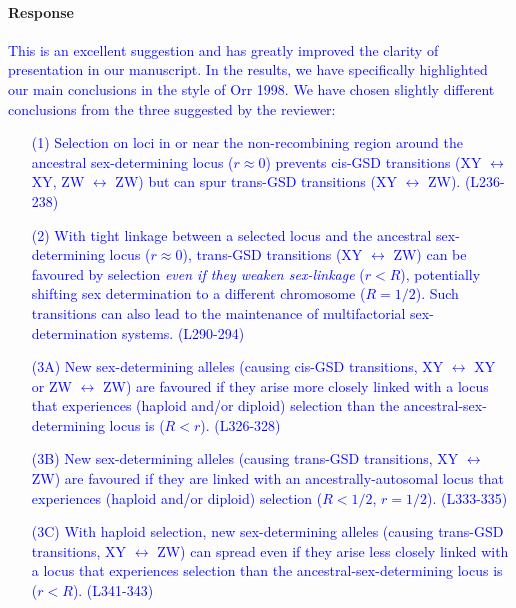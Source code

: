 \documentclass[10pt,letterpaper]{article}
\begin{document}
\noindent\paragraph{Response}
\textcolor{blue}{
This is an excellent suggestion and has greatly improved the clarity of presentation in our manuscript. In the results, we have specifically highlighted our main conclusions in the style of Orr 1998. We have chosen slightly different conclusions from the three suggested by the reviewer: 
\begin{enumerate}
\item[(1)] Selection on loci in or near the non-recombining region around the ancestral sex-determining locus ($r\approx0$) prevents cis-GSD transitions (XY $\leftrightarrow$ XY, ZW $\leftrightarrow$ ZW) but can spur trans-GSD transitions (XY $\leftrightarrow$ ZW). (L236-238)
\item[(2)] With tight linkage between a selected locus and the ancestral sex-determining locus ($r\approx0$), trans-GSD transitions (XY $\leftrightarrow$ ZW) can be favoured by selection \textit{even if they weaken sex-linkage} ($r<R$), potentially shifting sex determination to a different chromosome ($R=1/2$). 
Such transitions can also lead to the maintenance of multifactorial sex-determination systems. (L290-294)
\item[(3A)] New sex-determining alleles (causing cis-GSD transitions, XY $\leftrightarrow$ XY or ZW $\leftrightarrow$ ZW) are favoured if they arise more closely linked with a locus that experiences (haploid and/or diploid) selection than the ancestral-sex-determining locus is ($R<r$). (L326-328)
\item[(3B)] New sex-determining alleles (causing trans-GSD transitions, XY $\leftrightarrow$ ZW) are favoured if they are linked with an ancestrally-autosomal locus that experiences (haploid and/or diploid) selection ($R<1/2$, $r=1/2$). (L333-335)
\item[(3C)] With haploid selection, new sex-determining alleles (causing trans-GSD transitions, XY $\leftrightarrow$ ZW) can spread even if they arise less closely linked with a locus that experiences selection than the ancestral-sex-determining locus is ($r<R$). (L341-343)

\end{enumerate}}
\end{document}

